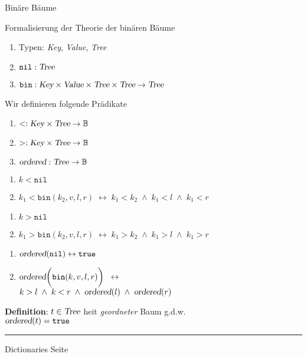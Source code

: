 \begin{slide}{}
\normalsize

\begin{center}
Bin\"are B\"aume
\end{center}
\vspace*{0.5cm}

\footnotesize
Formalisierung der Theorie der bin\"aren B\"aume 
\begin{enumerate}
\item Typen: \textsl{Key}, \textsl{Value}, \textsl{Tree}
\item $\mathtt{nil}: \textsl{Tree}$
\item $\mathtt{bin}: \textsl{Key} \times \textsl{Value} \times \textsl{Tree} \times \textsl{Tree} \rightarrow \textsl{Tree}$
\end{enumerate}
Wir definieren folgende Pr\"adikate 
\begin{enumerate}
\item $<: \textsl{Key} \times \textsl{Tree} \rightarrow \mathbb{B}$ 
\item $>: \textsl{Key} \times \textsl{Tree} \rightarrow \mathbb{B}$ 
\item $\textsl{ordered}: \textsl{Tree} \rightarrow \mathbb{B}$ 
\end{enumerate}
\begin{enumerate}
\item $k < \mathtt{nil}$
\item $k_1 < \mathtt{bin}(k_2, v, l, r) \;\leftrightarrow\; k_1 < k_2 \;\wedge\; k_1 < l \;\wedge\; k_1 < r$
\end{enumerate}
\begin{enumerate}
\item $k > \mathtt{nil}$
\item $k_1 > \mathtt{bin}(k_2, v, l, r) \;\leftrightarrow\; k_1 > k_2 \;\wedge\; k_1 > l \;\wedge\; k_1 > r$
\end{enumerate}
\begin{enumerate}
\item $\textsl{ordered}(\mathtt{nil}) \leftrightarrow \mathtt{true}$
\item $\textsl{ordered}\bigg(\mathtt{bin}(k,v,l,r)\bigg) \;\;\leftrightarrow\;$ \\[0.3cm]
      \hspace*{1.3cm} $k > l \;\wedge\; k < r \;\wedge\; \textsl{ordered}(l) \;\wedge\; \textsl{ordered}(r)$
\end{enumerate}
\textbf{Definition}: $t \in \textsl{Tree}$ hei\3t \emph{geordneter} Baum g.d.w. \\[0.3cm]
\hspace*{1.3cm} $\textsl{ordered}(t) = \mathtt{true}$

\vspace*{\fill}
\tiny \addtocounter{mypage}{1}
\rule{17cm}{1mm}
Dictionaries  \hspace*{\fill} Seite 
\end{slide}

